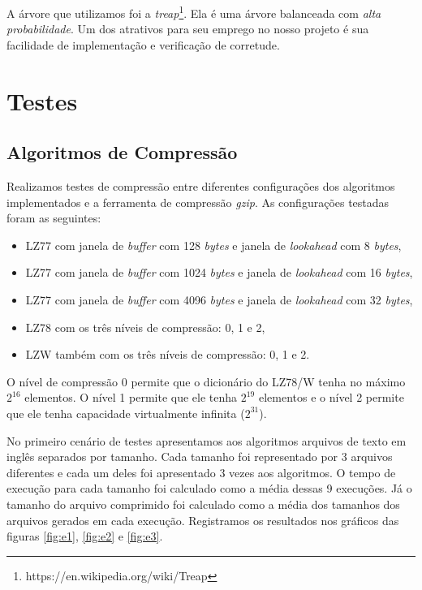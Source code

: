 \documentclass[]{article}
\begin{document}
A árvore que utilizamos foi a \textit{treap}\footnote{https://en.wikipedia.org/wiki/Treap}. Ela é uma árvore balanceada com \textit{alta probabilidade}. Um dos atrativos para seu emprego no nosso projeto é sua facilidade de implementação e verificação de corretude.

\section{Testes}

\subsection{Algoritmos de Compressão}


Realizamos testes de compressão entre diferentes configurações dos algoritmos implementados e a ferramenta de compressão \textit{gzip}. As configurações testadas foram as seguintes:
\begin{itemize}
	\item LZ77 com janela de \textit{buffer} com 128 \textit{bytes} e janela de \textit{lookahead} com 8 \textit{bytes},
	\item LZ77 com janela de \textit{buffer} com 1024 \textit{bytes} e janela de \textit{lookahead} com 16 \textit{bytes},
	\item LZ77 com janela de \textit{buffer} com 4096 \textit{bytes} e janela de \textit{lookahead} com 32 \textit{bytes},
	\item LZ78 com os três níveis de compressão: 0, 1 e 2, 
	\item LZW também com os três níveis de compressão: 0, 1 e 2.
\end{itemize}

O nível de compressão 0 permite que o dicionário do LZ78/W tenha no máximo $2^{16}$ elementos. O nível 1 permite que ele tenha $2^{19}$ elementos e o nível 2 permite que ele tenha capacidade virtualmente infinita ($2^{31}$).

No primeiro cenário de testes apresentamos aos algoritmos arquivos de texto em inglês separados por tamanho. Cada tamanho foi representado por 3 arquivos diferentes e cada um deles foi apresentado 3 vezes aos algoritmos. O tempo de execução para cada tamanho foi calculado como a média dessas 9 execuções. Já o tamanho do arquivo comprimido foi calculado como a média dos tamanhos dos arquivos gerados em cada execução. Registramos os resultados nos gráficos das figuras \ref{fig:e1}, \ref{fig:e2} e \ref{fig:e3}.
\end{document}

